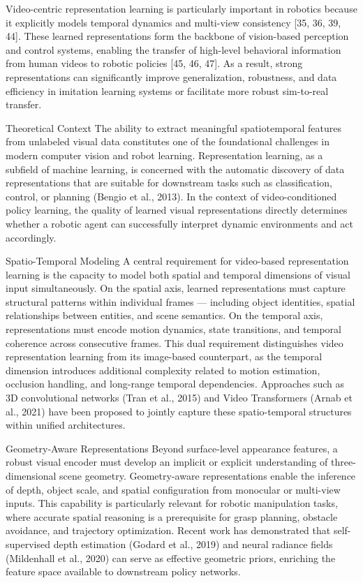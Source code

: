 Video-centric representation learning is particularly important in robotics because it explicitly models temporal dynamics and multi-view consistency [35, 36, 39, 44]. These learned representations form the backbone of vision-based perception and control systems, enabling the transfer of high-level behavioral information from human videos to robotic policies [45, 46, 47]. As a result, strong representations can significantly improve generalization, robustness, and data efficiency in imitation learning systems or facilitate more robust sim-to-real transfer.






Theoretical Context
The ability to extract meaningful spatiotemporal features from unlabeled visual data constitutes one of the foundational challenges in modern computer vision and robot learning. Representation learning, as a subfield of machine learning, is concerned with the automatic discovery of data representations that are suitable for downstream tasks such as classification, control, or planning (Bengio et al., 2013). In the context of video-conditioned policy learning, the quality of learned visual representations directly determines whether a robotic agent can successfully interpret dynamic environments and act accordingly.


Spatio-Temporal Modeling
A central requirement for video-based representation learning is the capacity to model both spatial and temporal dimensions of visual input simultaneously. On the spatial axis, learned representations must capture structural patterns within individual frames — including object identities, spatial relationships between entities, and scene semantics. On the temporal axis, representations must encode motion dynamics, state transitions, and temporal coherence across consecutive frames. This dual requirement distinguishes video representation learning from its image-based counterpart, as the temporal dimension introduces additional complexity related to motion estimation, occlusion handling, and long-range temporal dependencies. Approaches such as 3D convolutional networks (Tran et al., 2015) and Video Transformers (Arnab et al., 2021) have been proposed to jointly capture these spatio-temporal structures within unified architectures.


Geometry-Aware Representations
Beyond surface-level appearance features, a robust visual encoder must develop an implicit or explicit understanding of three-dimensional scene geometry. Geometry-aware representations enable the inference of depth, object scale, and spatial configuration from monocular or multi-view inputs. This capability is particularly relevant for robotic manipulation tasks, where accurate spatial reasoning is a prerequisite for grasp planning, obstacle avoidance, and trajectory optimization. Recent work has demonstrated that self-supervised depth estimation (Godard et al., 2019) and neural radiance fields (Mildenhall et al., 2020) can serve as effective geometric priors, enriching the feature space available to downstream policy networks.


